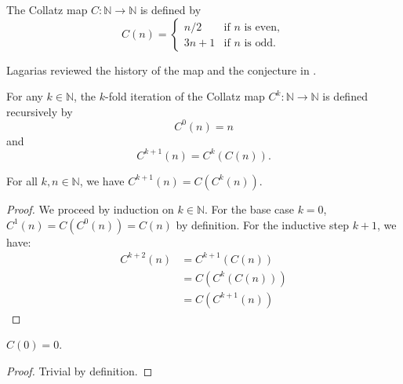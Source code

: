 \begin{definition}\label{def:collatz_step}\leanok
The Collatz map $C: \mathbb{N} \to \mathbb{N}$ is defined by
\begin{equation}
    C(n) =
    \begin{cases}
        n/2 & \text{if } n \text{ is even}, \\
        3n + 1 & \text{if } n \text{ is odd}.
    \end{cases}
\end{equation}
\end{definition}
Lagarias reviewed the history of the map and the conjecture in \cite{lagarias}.

\begin{definition}\label{def:collatz_iter}\leanok
For any $k \in \mathbb{N}$, the $k$-fold iteration of the Collatz map $C^k: \mathbb{N} \to \mathbb{N}$ is defined recursively by
\begin{equation}
    C^0(n) = n
\end{equation}
and
\begin{equation}
    C^{k+1}(n) = C^k(C(n)).
\end{equation}
\end{definition}

\begin{lemma}\label{lemma:collatz_iter_succ_right'}\leanok
For all $k, n \in \mathbb{N}$, we have $C^{k+1}(n) = C(C^k(n))$.
\end{lemma}
\begin{proof}\leanok
We proceed by induction on $k \in \mathbb{N}$.
For the base case $k=0$, $C^1(n) = C(C^0(n)) = C(n)$ by definition.
For the inductive step $k+1$, we have:
\begin{align*}
    C^{k+2}(n) &= C^{k+1}(C(n)) \tag{by definition} \\
    &= C(C^k(C(n))) \tag{by induction hypothesis applied to $C(n)$} \\
    &= C(C^{k+1}(n)) \tag{by definition.}
\end{align*}
\end{proof}

\begin{lemma}\label{lemma:collatz_step_zero}\leanok
$C(0) = 0$.
\end{lemma}
\begin{proof}\leanok
Trivial by definition.
\end{proof}

